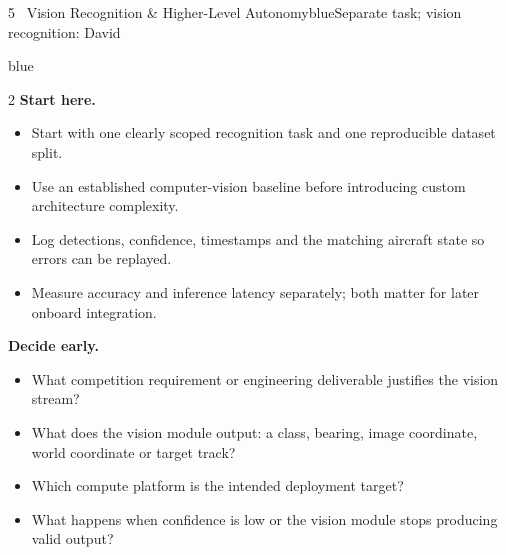 \documentclass[10pt,a4paper]{article}
\begin{document}
\begin{project}{5 \, Vision Recognition \& Higher-Level Autonomy}{blue}{Separate task; vision recognition: David}
\begin{research}{blue}
\smallskip
\begin{multicols}{2}\RaggedRight
\textbf{Start here.}
\begin{itemize}
  \item Start with one clearly scoped recognition task and one reproducible dataset split.
  \item Use an established computer-vision baseline before introducing custom architecture complexity.
  \item Log detections, confidence, timestamps and the matching aircraft state so errors can be replayed.
  \item Measure accuracy and inference latency separately; both matter for later onboard integration.
\end{itemize}
\columnbreak
\textbf{Decide early.}
\begin{itemize}
  \item What competition requirement or engineering deliverable justifies the vision stream?
  \item What does the vision module output: a class, bearing, image coordinate, world coordinate or target track?
  \item Which compute platform is the intended deployment target?
  \item What happens when confidence is low or the vision module stops producing valid output?
\end{itemize}
\end{multicols}
\end{research}
\end{project}
\end{document}
